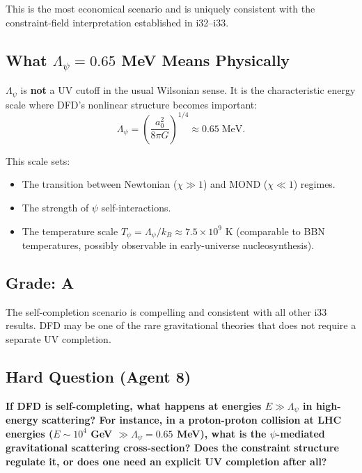 \documentclass[11pt,a4paper]{article}
\begin{document}
This is the most economical scenario and is uniquely consistent with the constraint-field interpretation established in i32--i33.

\subsection{What $\Lambda_\psi = 0.65$ MeV Means Physically}

$\Lambda_\psi$ is \textbf{not} a UV cutoff in the usual Wilsonian sense. It is the characteristic energy scale where DFD's nonlinear structure becomes important:
\begin{equation}
\Lambda_\psi = \left(\frac{a_0^2}{8\pi G}\right)^{1/4} \approx 0.65\;\text{MeV}.
\end{equation}

This scale sets:
\begin{itemize}
\item The transition between Newtonian ($\chi \gg 1$) and MOND ($\chi \ll 1$) regimes.
\item The strength of $\psi$ self-interactions.
\item The temperature scale $T_\psi = \Lambda_\psi/k_B \approx 7.5 \times 10^9$ K (comparable to BBN temperatures, possibly observable in early-universe nucleosynthesis).
\end{itemize}

\subsection{Grade: A}

The self-completion scenario is compelling and consistent with all other i33 results. DFD may be one of the rare gravitational theories that does not require a separate UV completion.

\subsection{Hard Question (Agent 8)}

\textbf{If DFD is self-completing, what happens at energies $E \gg \Lambda_\psi$ in high-energy scattering? For instance, in a proton-proton collision at LHC energies ($E \sim 10^4$ GeV $\gg \Lambda_\psi = 0.65$ MeV), what is the $\psi$-mediated gravitational scattering cross-section? Does the constraint structure regulate it, or does one need an explicit UV completion after all?}

\newpage

\end{document}
